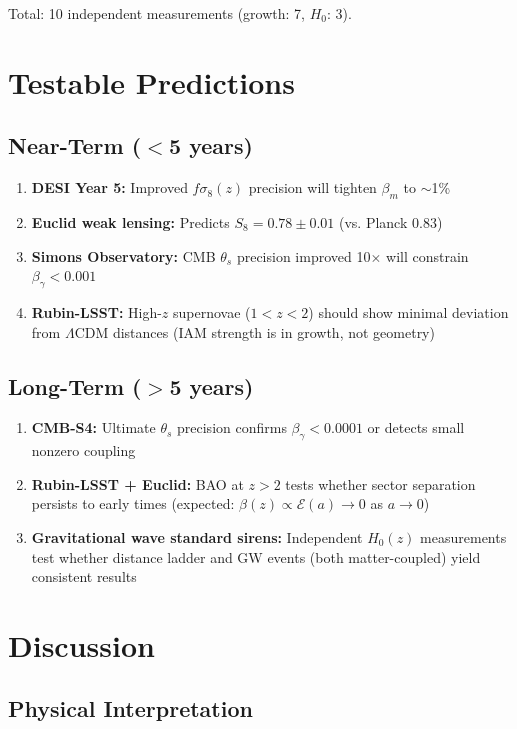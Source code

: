 \documentclass[twocolumn,superscriptaddress,prl,amsmath,amssymb]{revtex4-2}
\begin{document}
Total: 10 independent measurements (growth: 7, $H_0$: 3).

\section{Testable Predictions}

\subsection{Near-Term ($<$5 years)}

\begin{enumerate}
\item \textbf{DESI Year 5:} Improved $f\sigma_8(z)$ precision will tighten $\beta_m$ to $\sim$1\%
\item \textbf{Euclid weak lensing:} Predicts $S_8 = 0.78 \pm 0.01$ (vs. Planck 0.83)
\item \textbf{Simons Observatory:} CMB $\theta_s$ precision improved 10$\times$ will constrain $\beta_\gamma < 0.001$
\item \textbf{Rubin-LSST:} High-$z$ supernovae ($1 < z < 2$) should show minimal deviation from $\Lambda$CDM distances (IAM strength is in growth, not geometry)
\end{enumerate}

\subsection{Long-Term ($>$5 years)}

\begin{enumerate}
\item \textbf{CMB-S4:} Ultimate $\theta_s$ precision confirms $\beta_\gamma < 0.0001$ or detects small nonzero coupling
\item \textbf{Rubin-LSST + Euclid:} BAO at $z > 2$ tests whether sector separation persists to early times (expected: $\beta(z) \propto \mathcal{E}(a) \to 0$ as $a \to 0$)
\item \textbf{Gravitational wave standard sirens:} Independent $H_0(z)$ measurements test whether distance ladder and GW events (both matter-coupled) yield consistent results
\end{enumerate}

\section{Discussion}

\subsection{Physical Interpretation}
\end{document}
